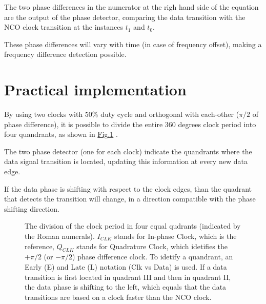 \documentclass[letterpaper,10pt,english,openany,oneside]{sphinxmanual}
\begin{document}
\begin{DUlineblock}{0em}
\item[] The two phase differences in the numerator at the righ hand side of the equation are the output of the phase detector, comparing the data transition with the NCO clock transition at the instances \(t_1\) and \(t_0\).
\item[] These phase differences will vary with time (in case of frequency offset), making a frequency difference detection possible.
\end{DUlineblock}


\section{Practical implementation}
\label{\detokenize{paper/phase_detector:practical-implementation}}
\begin{DUlineblock}{0em}
\item[] By using two clocks with 50\% duty cycle and orthogonal with each-other (\(\pi / 2\) of phase difference), it is possible to divide the entire 360 degrees clock period into four quandrants, as shown in \hyperref[\detokenize{paper/phase_detector:quadrants}]{Fig.\@ \ref{\detokenize{paper/phase_detector:quadrants}}} .
\item[] The two phase detector (one for each clock) indicate the quandrants where the data signal transition is located, updating this information at every new data edge.
\end{DUlineblock}

If the data phase is shifting with respect to the clock edges, than the quadrant that detects the transition will change, in a direction compatible with the phase shifting direction.

\begin{figure}[htbp]
\centering
\capstart

\noindent{}
\caption{The division of the clock period in four equal qudrants (indicated by the Roman numerals). \(I_{CLK}\) stands for In-phase Clock, which is the reference, \(Q_{CLK}\) stands for Quadrature Clock, which idetifies the \(+ \pi / 2\) (or \(- \pi /2\)) phase difference  clock. To idetify a quandrant, an Early (E) and Late (L) notation (Clk vs Data) is used. If a data transition is first located in quadrant III and then in quadrant II, the data phase is shifting to the left, which equals that the data transitions are based on a clock faster than the NCO clock.}\label{\detokenize{paper/phase_detector:id1}}\label{\detokenize{paper/phase_detector:quadrants}}\end{figure}
\end{document}
